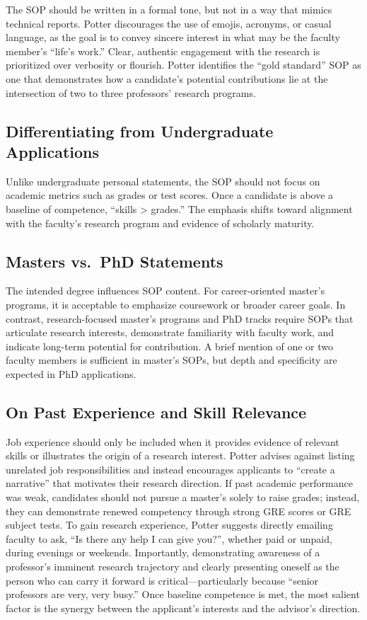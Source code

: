 The SOP should be written in a formal tone, but not in a way that mimics technical reports.
Potter discourages the use of emojis, acronyms, or casual language, as the goal is to convey sincere interest in what may be the faculty member's ``life's work.''
Clear, authentic engagement with the research is prioritized over verbosity or flourish.
Potter identifies the ``gold standard'' SOP as one that demonstrates how a candidate's potential contributions lie at the intersection of two to three professors' research programs.

\subsection{Differentiating from Undergraduate Applications}

Unlike undergraduate personal statements, the SOP should not focus on academic metrics such as grades or test scores.
Once a candidate is above a baseline of competence, ``skills > grades.''
The emphasis shifts toward alignment with the faculty's research program and evidence of scholarly maturity.

\subsection{Masters vs.\ PhD Statements}

The intended degree influences SOP content.
For career-oriented master's programs, it is acceptable to emphasize coursework or broader career goals.
In contrast, research-focused master's programs and PhD tracks require SOPs that articulate research interests, demonstrate familiarity with faculty work, and indicate long-term potential for contribution.
A brief mention of one or two faculty members is sufficient in master's SOPs, but depth and specificity are expected in PhD applications.

\subsection{On Past Experience and Skill Relevance}

Job experience should only be included when it provides evidence of relevant skills or illustrates the origin of a research interest.
Potter advises against listing unrelated job responsibilities and instead encourages applicants to ``create a narrative'' that motivates their research direction.
If past academic performance was weak, candidates should not pursue a master's solely to raise grades; instead, they can demonstrate renewed competency through strong GRE scores or GRE subject tests.
To gain research experience, Potter suggests directly emailing faculty to ask, ``Is there any help I can give you?'', whether paid or unpaid, during evenings or weekends.
Importantly, demonstrating awareness of a professor's imminent research trajectory and clearly presenting oneself as the person who can carry it forward is critical---particularly because ``senior professors are very, very busy.''
Once baseline competence is met, the most salient factor is the synergy between the applicant's interests and the advisor's direction.

